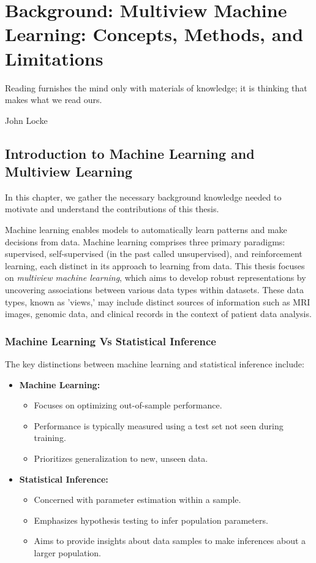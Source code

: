 \graphicspath{{chapters/background/}}
\chapter{Background: Multiview Machine Learning: Concepts, Methods, and Limitations}\label{chap:background}
\minitoc
\epigraph{Reading furnishes the mind only with materials of knowledge; it is thinking that makes what we read ours.}{John Locke}
\section{Introduction to Machine Learning and Multiview Learning}

In this chapter, we gather the necessary background knowledge needed to motivate and understand the contributions of this thesis.

Machine learning enables models to automatically learn patterns and make decisions from data.
Machine learning comprises three primary paradigms: supervised, self-supervised (in the past called unsupervised), and reinforcement learning, each distinct in its approach to learning from data.
This thesis focuses on \textit{multiview machine learning}, which aims to develop robust representations by uncovering associations between various data types within datasets.
These data types, known as 'views,' may include distinct sources of information such as MRI images, genomic data, and clinical records in the context of patient data analysis.

\subsection{Machine Learning Vs Statistical Inference}
The key distinctions between machine learning and statistical inference include:

\begin{itemize}
    \item \textbf{Machine Learning:}
    \begin{itemize}
        \item Focuses on optimizing out-of-sample performance.
        \item Performance is typically measured using a test set not seen during training.
        \item Prioritizes generalization to new, unseen data.
    \end{itemize}
    \item \textbf{Statistical Inference:}
    \begin{itemize}
        \item Concerned with parameter estimation within a sample.
        \item Emphasizes hypothesis testing to infer population parameters.
        \item Aims to provide insights about data samples to make inferences about a larger population.
    \end{itemize}
\end{itemize}

